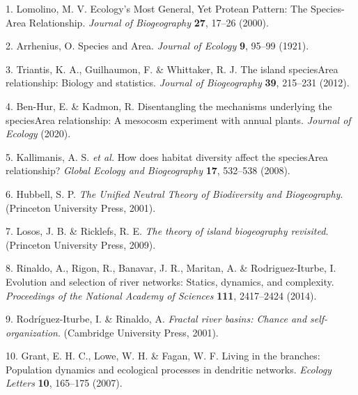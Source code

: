 \documentclass[
]{article}
\newenvironment{cslreferences}%
  {}%
  {\par}
\begin{document}
\hypertarget{refs}{}
\begin{cslreferences}
\leavevmode\hypertarget{ref-lomolinoEcologyMostGeneral2000a}{}%
1. Lomolino, M. V. Ecology's Most General, Yet Protean Pattern: The
Species-Area Relationship. \emph{Journal of Biogeography} \textbf{27},
17--26 (2000).

\leavevmode\hypertarget{ref-arrheniusSpeciesArea1921}{}%
2. Arrhenius, O. Species and Area. \emph{Journal of Ecology} \textbf{9},
95--99 (1921).

\leavevmode\hypertarget{ref-triantisIslandSpeciesArea2012}{}%
3. Triantis, K. A., Guilhaumon, F. \& Whittaker, R. J. The island
speciesArea relationship: Biology and statistics. \emph{Journal of
Biogeography} \textbf{39}, 215--231 (2012).

\leavevmode\hypertarget{ref-ben-hurDisentanglingMechanismsUnderlying2020}{}%
4. Ben-Hur, E. \& Kadmon, R. Disentangling the mechanisms underlying the
speciesArea relationship: A mesocosm experiment with annual plants.
\emph{Journal of Ecology} (2020).

\leavevmode\hypertarget{ref-kallimanisHowDoesHabitat2008a}{}%
5. Kallimanis, A. S. \emph{et al.} How does habitat diversity affect the
speciesArea relationship? \emph{Global Ecology and Biogeography}
\textbf{17}, 532--538 (2008).

\leavevmode\hypertarget{ref-hubbellUnifiedNeutralTheory2001}{}%
6. Hubbell, S. P. \emph{The Unified Neutral Theory of Biodiversity and
Biogeography}. (Princeton University Press, 2001).

\leavevmode\hypertarget{ref-lososTheoryIslandBiogeography2009}{}%
7. Losos, J. B. \& Ricklefs, R. E. \emph{The theory of island
biogeography revisited}. (Princeton University Press, 2009).

\leavevmode\hypertarget{ref-rinaldoEvolutionSelectionRiver2014}{}%
8. Rinaldo, A., Rigon, R., Banavar, J. R., Maritan, A. \&
Rodriguez-Iturbe, I. Evolution and selection of river networks: Statics,
dynamics, and complexity. \emph{Proceedings of the National Academy of
Sciences} \textbf{111}, 2417--2424 (2014).

\leavevmode\hypertarget{ref-rodriguez-iturbeFractalRiverBasins2001}{}%
9. Rodríguez-Iturbe, I. \& Rinaldo, A. \emph{Fractal river basins:
Chance and self-organization}. (Cambridge University Press, 2001).

\leavevmode\hypertarget{ref-grantLivingBranchesPopulation2007}{}%
10. Grant, E. H. C., Lowe, W. H. \& Fagan, W. F. Living in the branches:
Population dynamics and ecological processes in dendritic networks.
\emph{Ecology Letters} \textbf{10}, 165--175 (2007).


\end{cslreferences}
\end{document}
